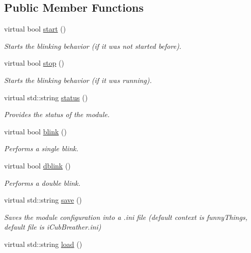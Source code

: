 \subsection*{Public Member Functions}
\begin{DoxyCompactItemize}
\item 
virtual bool \hyperlink{classiCubBlinker__IDL_ae72e3564848946679985de69309573ab}{start} ()
\begin{DoxyCompactList}\small\item\em Starts the blinking behavior (if it was not started before). \end{DoxyCompactList}\item 
virtual bool \hyperlink{classiCubBlinker__IDL_af669ee14a0f2b847921720621a9bc00f}{stop} ()
\begin{DoxyCompactList}\small\item\em Starts the blinking behavior (if it was running). \end{DoxyCompactList}\item 
virtual std\+::string \hyperlink{classiCubBlinker__IDL_a8a608d4eed94712df6c9aa7c65f0e21e}{status} ()
\begin{DoxyCompactList}\small\item\em Provides the status of the module. \end{DoxyCompactList}\item 
virtual bool \hyperlink{classiCubBlinker__IDL_af0ce78d699febd83051777f305a7085d}{blink} ()
\begin{DoxyCompactList}\small\item\em Performs a single blink. \end{DoxyCompactList}\item 
virtual bool \hyperlink{classiCubBlinker__IDL_a1701dfbea4e6e22c5c1ad383dc773ab8}{dblink} ()
\begin{DoxyCompactList}\small\item\em Performs a double blink. \end{DoxyCompactList}\item 
virtual std\+::string \hyperlink{classiCubBlinker__IDL_a06845af0295ad022f265569e4694e97d}{save} ()
\begin{DoxyCompactList}\small\item\em Saves the module configuration into a .ini file (default context is funny\+Things, default file is i\+Cub\+Breather.\+ini) \end{DoxyCompactList}\item 
virtual std\+::string \hyperlink{classiCubBlinker__IDL_a6de8b7e26a2c8c24362c64bf28755d2f}{load} ()

\end{DoxyCompactItemize}
